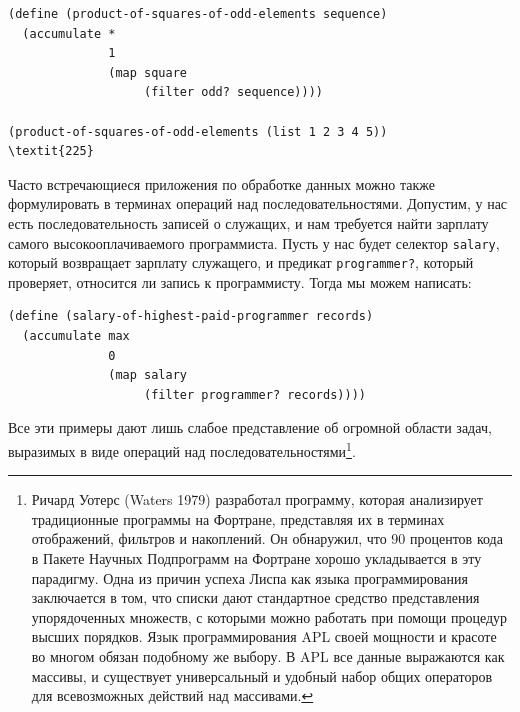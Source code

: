 \begin{Verbatim}[fontsize=\small]
(define (product-of-squares-of-odd-elements sequence)
  (accumulate *
              1
              (map square
                   (filter odd? sequence))))

(product-of-squares-of-odd-elements (list 1 2 3 4 5))
\textit{225}
\end{Verbatim}

Часто встречающиеся приложения по
обработке данных можно также формулировать в терминах операций над последовательностями.
Допустим, у нас есть последовательность записей о служащих, и нам
требуется найти зарплату самого высокооплачиваемого программиста.
Пусть у нас будет селектор {\tt salary}, который возвращает
зарплату служащего, и предикат {\tt programmer?}, который
проверяет, относится ли запись к программисту.  Тогда мы можем
написать:

\begin{Verbatim}[fontsize=\small]
(define (salary-of-highest-paid-programmer records)
  (accumulate max
              0
              (map salary
                   (filter programmer? records))))
\end{Verbatim}
\pagebreak

Все эти примеры дают лишь слабое представление об огромной области задач,
выразимых в виде операций над последовательностями\footnote{Ричард
  Уотерс (Waters 1979)
разработал
программу, которая анализирует традиционные программы на
Фортране,
представляя их в терминах отображений, фильтров и накоплений.  Он
обнаружил, что 90 процентов кода в Пакете Научных Подпрограмм на
Фортране хорошо укладывается в эту парадигму.  Одна из причин успеха
Лиспа как языка программирования заключается в том, что списки дают
стандартное средство представления упорядоченных множеств, с которыми
можно работать при помощи процедур высших порядков.  Язык
программирования APL своей мощности и красоте во многом обязан
подобному же выбору. В APL все данные выражаются как массивы, и
существует универсальный и удобный набор общих операторов для
всевозможных действий над массивами.}.


